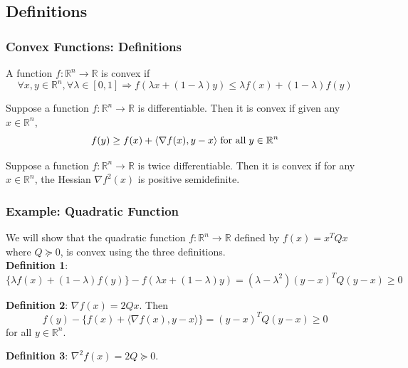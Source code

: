\subsection{Definitions}
\begin{frame}\frametitle{Convex Functions: Definitions}
    \begin{definition}
        A function $f: \mathbb{R}^n \rightarrow \mathbb{R}$ is convex if
        \begin{equation*}
            \forall x, y \in \mathbb{R}^n, \forall \lambda \in [0,1] \Rightarrow f(\lambda x + (1-\lambda)y) \leq \lambda f(x) + (1-\lambda)f(y)
        \end{equation*}
    \end{definition}

    \begin{definition}
        Suppose a function $f: \mathbb{R}^n \rightarrow \mathbb{R}$ is differentiable. Then it is convex if given any $x \in \mathbb{R}^n$,
        \begin{equation*}
            f(y) \geq f(x)+ \langle \nabla f(x), y-x \rangle \hspace{1mm} \text{for all} \hspace{1mm} y \in \mathbb{R}^n
        \end{equation*}
    \end{definition}
    \begin{definition}
        Suppose a function $f: \mathbb{R}^n \rightarrow \mathbb{R}$ is twice differentiable. Then it is convex if for any $x \in \mathbb{R}^n$, the Hessian $\nabla f^2 (x)$ is positive semidefinite.
    \end{definition}
    
\end{frame}

\begin{frame}\frametitle{Example: Quadratic Function}
    We will show that the quadratic function
     $f:\mathbb{R}^n \rightarrow \mathbb{R}$ defined by $f(x) = x^T Q x$ where $Q \succcurlyeq 0$, is convex using the three definitions.\\
    \textbf{Definition 1}: 
    \begin{equation*}
        \{\lambda f(x) + (1-\lambda)f(y)\} -  f(\lambda x + (1-\lambda)y) = (\lambda - \lambda^2)(y-x)^T Q (y-x) \geq 0 
    \end{equation*}
    
    \textbf{Definition 2}: $\nabla f(x) = 2Qx$. Then
    \begin{equation*}
        f(y) - \{f(x)+\langle \nabla f(x), y-x \rangle\} 
        = (y-x)^{T}Q(y-x) \geq 0
    \end{equation*}
    for all $y \in \mathbb{R}^n$.

    \textbf{Definition 3}: $\nabla^2 f(x) = 2Q \succcurlyeq 0$.
    
\end{frame}

